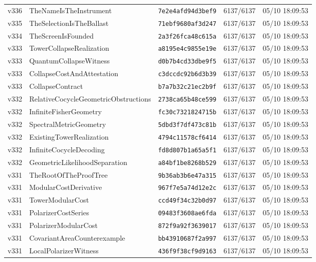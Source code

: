 \documentclass[11pt]{article}
\theoremstyle{definition}\newtheorem{deriv}{Derivação}
\begin{document}
{\begin{longtable}{@{}lllll@{}}
v336 & TheNameIsTheInstrument & \texttt{7e2e4afd94d3bef9} & 6137/6137 & 05/10 18:09:53 \\
v335 & TheSelectionIsTheBallast & \texttt{71ebf9680af3d247} & 6137/6137 & 05/10 18:09:53 \\
v334 & TheScreenIsFounded & \texttt{2a3f26fca48c615a} & 6137/6137 & 05/10 18:09:53 \\
v333 & TowerCollapseRealization & \texttt{a8195e4c9855e19e} & 6137/6137 & 05/10 18:09:53 \\
v333 & QuantumCollapseWitness & \texttt{d0b7b4cd33dbe9f5} & 6137/6137 & 05/10 18:09:53 \\
v333 & CollapseCostAndAttestation & \texttt{c3dccdc92b6d3b39} & 6137/6137 & 05/10 18:09:53 \\
v333 & CollapseContract & \texttt{b7a7b32c21ec2b9f} & 6137/6137 & 05/10 18:09:53 \\
v332 & RelativeCocycleGeometricObstructions & \texttt{2738ca65b48ce599} & 6137/6137 & 05/10 18:09:53 \\
v332 & InfiniteFisherGeometry & \texttt{fc30c7321824715b} & 6137/6137 & 05/10 18:09:53 \\
v332 & SpectralMetricGeometry & \texttt{5dbd3f7df473c81b} & 6137/6137 & 05/10 18:09:53 \\
v332 & ExistingTowerRealization & \texttt{4794c11578cf6414} & 6137/6137 & 05/10 18:09:53 \\
v332 & InfiniteCocycleDecoding & \texttt{fd8d807b1a65a5f1} & 6137/6137 & 05/10 18:09:53 \\
v332 & GeometricLikelihoodSeparation & \texttt{a84bf1be8268b529} & 6137/6137 & 05/10 18:09:53 \\
v331 & TheRootOfTheProofTree & \texttt{9b36ab3b6e47a315} & 6137/6137 & 05/10 18:09:53 \\
v331 & ModularCostDerivative & \texttt{967f7e5a74d12e2c} & 6137/6137 & 05/10 18:09:53 \\
v331 & TowerModularCost & \texttt{ccd49f34c32b0d97} & 6137/6137 & 05/10 18:09:53 \\
v331 & PolarizerCostSeries & \texttt{09483f3608ae6fda} & 6137/6137 & 05/10 18:09:53 \\
v331 & PolarizerModularCost & \texttt{872f9a92f3639017} & 6137/6137 & 05/10 18:09:53 \\
v331 & CovariantAreaCounterexample & \texttt{bb43910687f2a997} & 6137/6137 & 05/10 18:09:53 \\
v331 & LocalPolarizerWitness & \texttt{436f9f38cf9d9163} & 6137/6137 & 05/10 18:09:53 \\

\end{longtable}}
\end{document}
